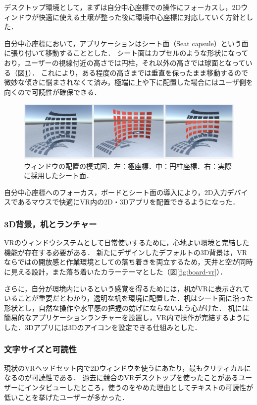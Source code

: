 デスクトップ環境として，まずは自分中心座標での操作にフォーカスし，2Dウィンドウが快適に使える土壌が整った後に環境中心座標に対応していく方針とした．

自分中心座標において，アプリケーションはシート面（Seat capsule）という面に張り付いて移動することとした．
シート面はカプセルのような形状になっており，ユーザーの視線付近の高さでは円柱，それ以外の高さでは球面となっている（図\ref{fig:seat}）．
これにより，ある程度の高さまでは垂直を保ったまま移動するので微妙な傾きに悩まされなくて済み，極端に上や下に配置した場合にはユーザ側を向くので可読性が確保できる．

\begin{figure}[htbp]
  \centering
  \includegraphics[keepaspectratio, width=0.9\linewidth]{fig/development/seat-capsule.png}
  \caption{ウィンドウの配置の模式図．左：極座標．中：円柱座標．右：実際に採用したシート面．}
  \label{fig:seat}
\end{figure}

自分中心座標へのフォーカス，ボードとシート面の導入により，2D入力デバイスであるマウスで快適にVR内の2D・3Dアプリを配置できるようになった．

\subsubsection{3D背景，机とランチャー}
VRのウィンドウシステムとして日常使いするために，心地よい環境と完結した機能が存在する必要がある．
新たにデザインしたデフォルトの3D背景は，VRならではの開放感と作業環境としての落ち着きを両立するため，天井と空が同時に見える設計，また落ち着いたカラーテーマとした（図\ref{fig:board-vr}）．

さらに，自分が環境内にいるという感覚を得るためには，机がVRに表示されていることが重要だとわかり，透明な机を環境に配置した．机はシート面に沿った形状とし，自然な操作や水平感の把握の妨げにならないよう心がけた．
机には簡易的なアプリケーションランチャーを設置し，VR内で操作が完結するようにした．3Dアプリには3Dのアイコンを設定できる仕組みとした．

\subsubsection{文字サイズと可読性}
現状のVRヘッドセット内で2Dウィンドウを使うにあたり，最もクリティカルになるのが可読性である．
過去に競合のVRデスクトップを使ったことがあるユーザーにインタビューしたところ，使うのをやめた理由としてテキストの可読性が低いことを挙げたユーザーが多かった．

